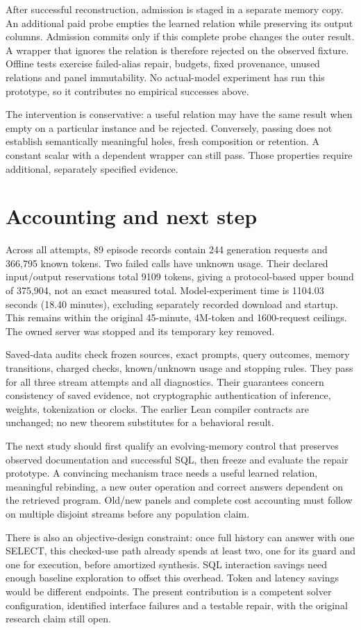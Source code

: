 \documentclass[10pt,twocolumn]{article}
\begin{document}
After successful reconstruction, admission is staged in a separate memory copy.
An additional paid probe empties the learned relation while preserving its
output columns. Admission commits only if this complete probe changes the outer
result. A wrapper that ignores the relation is therefore rejected on the
observed fixture. Offline tests exercise failed-alias repair, budgets, fixed
provenance, unused relations and panel immutability. No actual-model experiment
has run this prototype, so it contributes no empirical successes above.

The intervention is conservative: a useful relation may have the same result
when empty on a particular instance and be rejected. Conversely, passing does
not establish semantically meaningful holes, fresh composition or retention.
A constant scalar with a dependent wrapper can still pass. Those properties
require additional, separately specified evidence.

\newpage
\section{Accounting and next step}
Across all attempts, 89 episode records contain 244 generation requests and
366,795 known tokens. Two failed calls have unknown usage. Their declared
input/output reservations total 9109 tokens, giving a protocol-based upper
bound of 375,904, not an exact measured total. Model-experiment time is 1104.03
seconds (18.40 minutes), excluding separately recorded download and startup.
This remains within the original 45-minute, 4M-token and 1600-request ceilings.
The owned server was stopped and its temporary key removed.

Saved-data audits check frozen sources, exact prompts, query outcomes, memory
transitions, charged checks, known/unknown usage and stopping rules. They pass
for all three stream attempts and all diagnostics. Their guarantees concern
consistency of saved evidence, not cryptographic authentication of inference,
weights, tokenization or clocks. The earlier Lean compiler contracts are
unchanged; no new theorem substitutes for a behavioral result.

The next study should first qualify an evolving-memory control that preserves
observed documentation and successful SQL, then freeze and evaluate the repair
prototype. A convincing mechanism trace needs a useful learned relation,
meaningful rebinding, a new outer operation and correct answers dependent on the
retrieved program. Old/new panels and complete cost accounting must follow on
multiple disjoint streams before any population claim.

There is also an objective-design constraint: once full history can answer with
one SELECT, this checked-use path already spends at least two, one for its guard
and one for execution, before amortized synthesis. SQL interaction savings need
enough baseline exploration to offset this overhead. Token and latency savings
would be different endpoints. The present contribution is a competent solver
configuration, identified interface failures and a testable repair, with the
original research claim still open.
\end{document}
